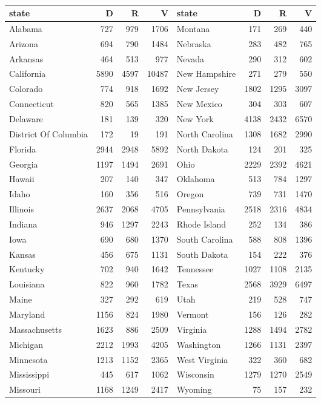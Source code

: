 \begingroup\
\begin{tabular}{lrrrlrrr}
  \hline
state & D & R & V & state & D & R & V \\ 
  \hline
Alabama & 727 & 979 & 1706 & Montana & 171 & 269 & 440 \\ 
  Arizona & 694 & 790 & 1484 & Nebraska & 283 & 482 & 765 \\ 
  Arkansas & 464 & 513 & 977 & Nevada & 290 & 312 & 602 \\ 
  California & 5890 & 4597 & 10487 & New Hampshire & 271 & 279 & 550 \\ 
  Colorado & 774 & 918 & 1692 & New Jersey & 1802 & 1295 & 3097 \\ 
  Connecticut & 820 & 565 & 1385 & New Mexico & 304 & 303 & 607 \\ 
  Delaware & 181 & 139 & 320 & New York & 4138 & 2432 & 6570 \\ 
  District Of Columbia & 172 &  19 & 191 & North Carolina & 1308 & 1682 & 2990 \\ 
  Florida & 2944 & 2948 & 5892 & North Dakota & 124 & 201 & 325 \\ 
  Georgia & 1197 & 1494 & 2691 & Ohio & 2229 & 2392 & 4621 \\ 
  Hawaii & 207 & 140 & 347 & Oklahoma & 513 & 784 & 1297 \\ 
  Idaho & 160 & 356 & 516 & Oregon & 739 & 731 & 1470 \\ 
  Illinois & 2637 & 2068 & 4705 & Pennsylvania & 2518 & 2316 & 4834 \\ 
  Indiana & 946 & 1297 & 2243 & Rhode Island & 252 & 134 & 386 \\ 
  Iowa & 690 & 680 & 1370 & South Carolina & 588 & 808 & 1396 \\ 
  Kansas & 456 & 675 & 1131 & South Dakota & 154 & 222 & 376 \\ 
  Kentucky & 702 & 940 & 1642 & Tennessee & 1027 & 1108 & 2135 \\ 
  Louisiana & 822 & 960 & 1782 & Texas & 2568 & 3929 & 6497 \\ 
  Maine & 327 & 292 & 619 & Utah & 219 & 528 & 747 \\ 
  Maryland & 1156 & 824 & 1980 & Vermont & 156 & 126 & 282 \\ 
  Massachusetts & 1623 & 886 & 2509 & Virginia & 1288 & 1494 & 2782 \\ 
  Michigan & 2212 & 1993 & 4205 & Washington & 1266 & 1131 & 2397 \\ 
  Minnesota & 1213 & 1152 & 2365 & West Virginia & 322 & 360 & 682 \\ 
  Mississippi & 445 & 617 & 1062 & Wisconsin & 1279 & 1270 & 2549 \\ 
  Missouri & 1168 & 1249 & 2417 & Wyoming &  75 & 157 & 232 \\ 
   \hline
\end{tabular}
\endgroup

